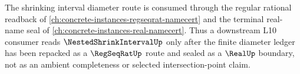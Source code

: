 The shrinking interval diameter route is consumed through the regular rational readback of \autoref{ch:concrete-instances-regseqrat-namecert} and the terminal real-name seal of \autoref{ch:concrete-instances-real-namecert}. Thus a downstream L10 consumer reads $\NestedShrinkIntervalUp$ only after the finite diameter ledger has been repacked as a $\RegSeqRatUp$ route and sealed as a $\RealUp$ boundary, not as an ambient completeness or selected intersection-point claim.
